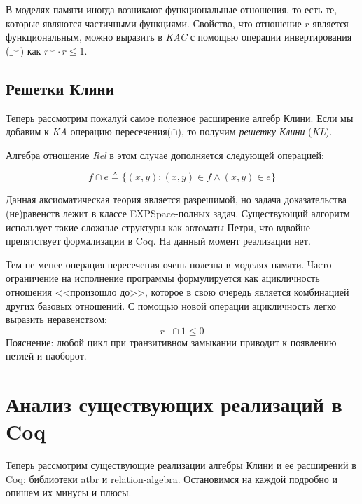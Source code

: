 \documentclass[times
              ]{itmo-student-thesis}
\begin{document}
      В моделях памяти иногда возникают функциональные отношения, то есть те, которые являются
      частичными функциями. Свойство, что отношение $ r $ является функциональным, можно выразить в
      \textit{KAC} с помощью операции инвертирования ($ \_^{\smile} $) как $ r^{\smile} \cdot r \leq 1 $.


    \subsection{Решетки Клини}
      Теперь рассмотрим пожалуй самое полезное расширение алгебр Клини.
      Если мы добавим к \textit{KA} операцию пересечения($\cap$), то получим \textit{решетку Клини} (\textit{KL}).

      Алгебра отношение \textit{Rel} в этом случае дополняется следующей операцией:

      $$ f \cap e \triangleq \{ (x, y) \colon (x, y) \in f \wedge (x, y) \in e \} $$

      Данная аксиоматическая теория является разрешимой, но задача доказательства (не)равенств лежит в
      классе EXPSpace-полных задач\cite{AlgebrasOfRelation}. Существующий алгоритм использует такие
      сложные структуры как автоматы Петри, что вдвойне препятствует формализации в Coq. На данный
      момент реализации нет.

      Тем не менее операция пересечения очень полезна в моделях памяти.
      Часто ограничение на исполнение программы формулируется как ацикличность отношения <<произошло
      до>>, которое в свою очередь является комбинацией других базовых отношений\cite{rc11}. С помощью
      новой операции ацикличность легко выразить неравенством:
      $$ r^+ \cap 1 \leq 0 $$
      Пояснение: любой цикл при транзитивном замыкании приводит к появлению петлей и наоборот.

  \section{Анализ существующих реализаций в Coq}

    Теперь рассмотрим существующие реализации алгебры Клини и ее расширений в Coq: библиотеки
    atbr\cite{atbr} и relation-algebra\cite{kat}.
    Остановимся на каждой подробно и опишем их минусы и плюсы.
\end{document}
